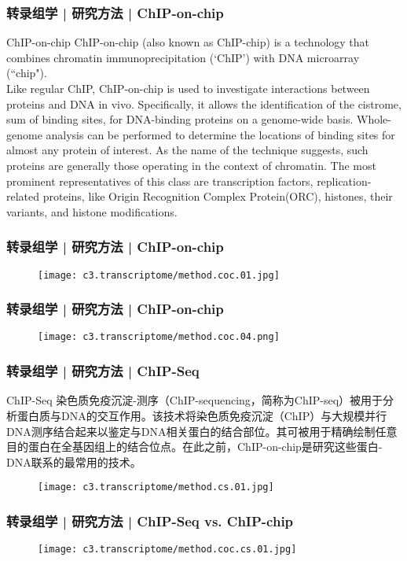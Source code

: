 \begin{frame}
  \frametitle{转录组学 | 研究方法 | ChIP-on-chip}
  \begin{block}{ChIP-on-chip}
    ChIP-on-chip (also known as ChIP-chip) is a technology that combines chromatin immunoprecipitation (`ChIP') with DNA microarray (``chip").\\
    \vspace{1em}
    Like regular ChIP, ChIP-on-chip is used to investigate interactions between proteins and DNA in vivo. Specifically, it allows the identification of the cistrome, sum of binding sites, for DNA-binding proteins on a genome-wide basis. Whole-genome analysis can be performed to determine the locations of binding sites for almost any protein of interest. As the name of the technique suggests, such proteins are generally those operating in the context of chromatin. The most prominent representatives of this class are transcription factors, replication-related proteins, like Origin Recognition Complex Protein(ORC), histones, their variants, and histone modifications.
  \end{block}
\end{frame}

\begin{frame}
  \frametitle{转录组学 | 研究方法 | ChIP-on-chip}
  \begin{figure}
    \centering
    \texttt{[image: c3.transcriptome/method.coc.01.jpg]}
  \end{figure}
\end{frame}

\begin{frame}
  \frametitle{转录组学 | 研究方法 | ChIP-on-chip}
  \begin{figure}
    \centering
    \texttt{[image: c3.transcriptome/method.coc.04.png]}
  \end{figure}
\end{frame}

\begin{frame}
  \frametitle{转录组学 | 研究方法 | ChIP-Seq}
  {\footnotesize
  \begin{block}{ChIP-Seq}
    染色质免疫沉淀-测序（ChIP-sequencing，简称为ChIP-seq）被用于分析蛋白质与DNA的交互作用。该技术将染色质免疫沉淀（ChIP）与大规模并行DNA测序结合起来以鉴定与DNA相关蛋白的结合部位。其可被用于精确绘制任意目的蛋白在全基因组上的结合位点。在此之前，ChIP-on-chip是研究这些蛋白-DNA联系的最常用的技术。
  \end{block}
  }
  \begin{figure}
    \centering
    \texttt{[image: c3.transcriptome/method.cs.01.jpg]}
  \end{figure}
\end{frame}

\begin{frame}
  \frametitle{转录组学 | 研究方法 | ChIP-Seq vs. ChIP-chip}
  \begin{figure}
    \centering
    \texttt{[image: c3.transcriptome/method.coc.cs.01.jpg]}
  \end{figure}
\end{frame}
